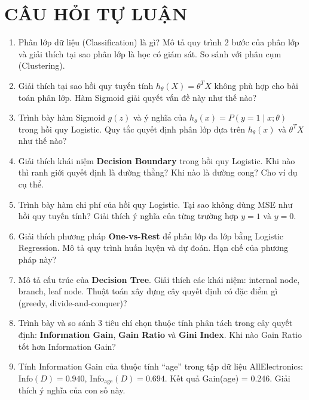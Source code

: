 \documentclass[10pt]{article}
\begin{document}
\newpage
\section{CÂU HỎI TỰ LUẬN}

\begin{enumerate}[leftmargin=*, label=\textbf{Câu \arabic*.}]

    \item Phân lớp dữ liệu (Classification) là gì? Mô tả quy trình 2 bước của phân lớp và giải thích tại sao phân lớp là học có giám sát. So sánh với phân cụm (Clustering).

    \item Giải thích tại sao hồi quy tuyến tính $h_\theta(X) = \theta^TX$ không phù hợp cho bài toán phân lớp. Hàm Sigmoid giải quyết vấn đề này như thế nào?

    \item Trình bày hàm Sigmoid $g(z)$ và ý nghĩa của $h_\theta(x) = P(y=1 \mid x; \theta)$ trong hồi quy Logistic. Quy tắc quyết định phân lớp dựa trên $h_\theta(x)$ và $\theta^TX$ như thế nào?

    \item Giải thích khái niệm \textbf{Decision Boundary} trong hồi quy Logistic. Khi nào thì ranh giới quyết định là đường thẳng? Khi nào là đường cong? Cho ví dụ cụ thể.

    \item Trình bày hàm chi phí của hồi quy Logistic. Tại sao không dùng MSE như hồi quy tuyến tính? Giải thích ý nghĩa của từng trường hợp $y=1$ và $y=0$.

    \item Giải thích phương pháp \textbf{One-vs-Rest} để phân lớp đa lớp bằng Logistic Regression. Mô tả quy trình huấn luyện và dự đoán. Hạn chế của phương pháp này?

    \item Mô tả cấu trúc của \textbf{Decision Tree}. Giải thích các khái niệm: internal node, branch, leaf node. Thuật toán xây dựng cây quyết định có đặc điểm gì (greedy, divide-and-conquer)?

    \item Trình bày và so sánh 3 tiêu chí chọn thuộc tính phân tách trong cây quyết định: \textbf{Information Gain}, \textbf{Gain Ratio} và \textbf{Gini Index}. Khi nào Gain Ratio tốt hơn Information Gain?

    \item Tính Information Gain của thuộc tính ``age'' trong tập dữ liệu AllElectronics: $\text{Info}(D) = 0.940$, $\text{Info}_{\text{age}}(D) = 0.694$. Kết quả Gain(age) = 0.246. Giải thích ý nghĩa của con số này.


\end{enumerate}
\end{document}
